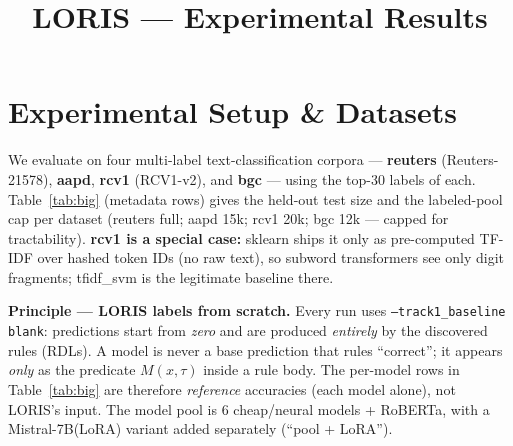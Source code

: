 \documentclass[11pt]{article}
\title{LORIS --- Experimental Results}\date{}
\begin{document}
\maketitle
\section{Experimental Setup \& Datasets}
We evaluate on four multi-label text-classification corpora --- \textbf{reuters} (Reuters-21578),
\textbf{aapd}, \textbf{rcv1} (RCV1-v2), and \textbf{bgc} --- using the top-30 labels of each. Table~\ref{tab:big}
(metadata rows) gives the held-out test size and the labeled-pool cap per dataset (reuters full; aapd 15k;
rcv1 20k; bgc 12k --- capped for tractability). \textbf{rcv1 is a special case:} sklearn ships it only as
pre-computed TF-IDF over hashed token IDs (no raw text), so subword transformers see only digit fragments;
tfidf\_svm is the legitimate baseline there.

\textbf{Principle --- LORIS labels from scratch.} Every run uses \texttt{--track1\_baseline blank}:
predictions start from \emph{zero} and are produced \emph{entirely} by the discovered rules (RDLs). A
model is never a base prediction that rules ``correct''; it appears \emph{only} as the predicate
$M(x,\tau)$ inside a rule body. The per-model rows in Table~\ref{tab:big} are therefore \emph{reference}
accuracies (each model alone), not LORIS's input. The model pool is 6 cheap/neural models + RoBERTa, with
a Mistral-7B(LoRA) variant added separately (``pool + LoRA'').
\end{document}
